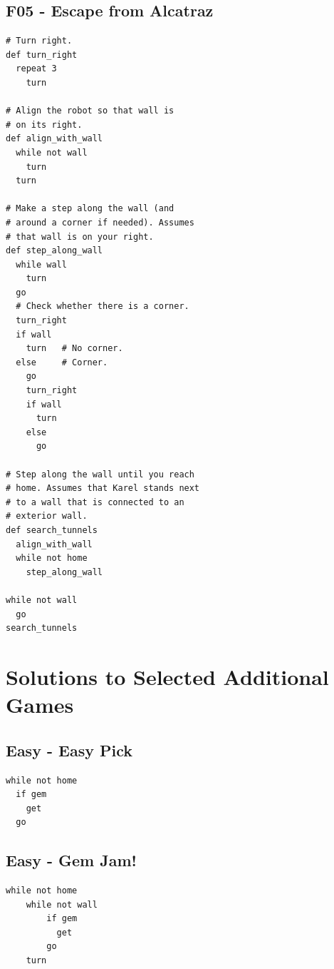 \documentclass[article,A4,12pt]{llncs}
\begin{document}
\subsection{F05 - Escape from Alcatraz}

\begin{verbatim}
# Turn right.
def turn_right
  repeat 3
    turn

# Align the robot so that wall is 
# on its right.
def align_with_wall
  while not wall 
    turn
  turn

# Make a step along the wall (and 
# around a corner if needed). Assumes 
# that wall is on your right. 
def step_along_wall
  while wall 
    turn
  go
  # Check whether there is a corner.
  turn_right
  if wall 
    turn   # No corner.   
  else     # Corner.
    go
    turn_right
    if wall 
      turn
    else 
      go
      
# Step along the wall until you reach 
# home. Assumes that Karel stands next 
# to a wall that is connected to an 
# exterior wall.
def search_tunnels
  align_with_wall
  while not home
    step_along_wall

while not wall
  go
search_tunnels
\end{verbatim}

\section{Solutions to Selected Additional Games}

\subsection{Easy - Easy Pick}
\begin{verbatim}
while not home
  if gem 
    get
  go
\end{verbatim}

\subsection{Easy - Gem Jam!}
\begin{verbatim}
while not home
    while not wall
        if gem 
          get
        go
    turn
\end{verbatim}
\end{document}
